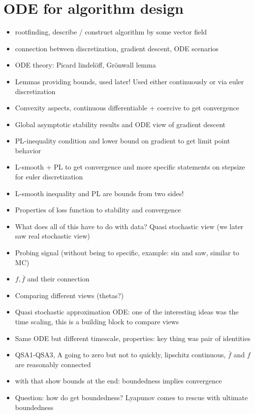 \section{ODE for algorithm design}
\begin{itemize}
    \item rootfinding, describe / construct algorithm by some vector field 
    \item connection between discretization, gradient descent, ODE scenarios
    \item ODE theory: Picard lindelöff, Grönwall lemma
    \item Lemmas providing bounds, used later! Used either continuously or via euler discretization 
    \item Convexity aspects, continuous differentiable + coercive to get convergence 
    \item Global asymptotic stability results and ODE view of gradient descent 
    \item PL-inequality condition and lower bound on gradient to get limit point behavior
    \item L-smooth + PL to get convergence and more specific statements on stepsize for euler discretization
    \item L-smooth inequality and PL are bounds from two sides! 
    \item Properties of loss function to stability and convergence 
    \item What does all of this have to do with data? Quasi stochastic view (we later saw real stochastic view)
    \item Probing signal (without being to specific, example: sin and saw, similar to MC)
    \item  \(f,\bar{f}\) and their connection
    \item Comparing different views (thetas?)
    \item Quasi stochastic approximation ODE: one of the interesting ideas was the time scaling, this is a building block to compare views
    \item Same ODE but different timescale, properties: key thing was pair of identities
    \item QSA1-QSA3, A going to zero but not to quickly, lipschitz continuous, \(\bar{f}\) and \(f\) are reasonably connected 
    \item with that show bounds at the end: boundedness implies convergence  
    \item Question: how do get boundedness? Lyapunov comes to rescue with ultimate boundedness

\end{itemize}
